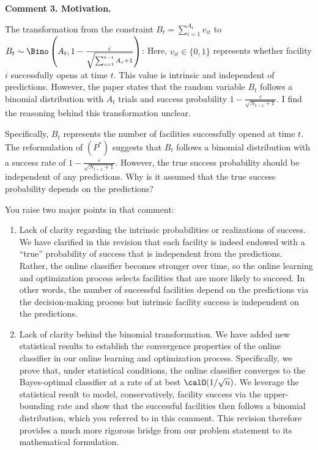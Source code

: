 \documentclass[11pt]{article}
\begin{document}
\begin{commentBox}
    \textbf{Comment 3. Motivation.}\label{R2:3}

    The transformation from the constraint $B_t=\sum_{i=1}^{A_t} v_{it}$ to $B_t\sim \Bino\left(A_t, 1-\frac{\varepsilon}{\sqrt{\sum_{s=1}^{t-1} A_s +1}}\right)$: Here, $v_{it}\in \{0,1\}$ represents whether facility $i$ successfully opens at time $t$. This value is intrinsic and independent of predictions. However, the paper states that the random variable $B_t$ follows a binomial distribution with $A_t$ trials and success probability $1-\frac{\varepsilon}{\sqrt{N_{t-1}+1}}$. I find the reasoning behind this transformation unclear.

    Specifically, $B_t$ represents the number of facilities successfully opened at time $t$. The reformulation of $(P^*)$ suggests that $B_t$ follows a binomial distribution with a success rate of $1-\frac{\varepsilon}{\sqrt{N_{t-1}+1}}$. However, the true success probability should be independent of any predictions. Why is it assumed that the true success probability depends on the predictions?
\end{commentBox}

You raise two major points in that comment:
\begin{enumerate}
    \item Lack of clarity regarding the intrinsic probabilities or realizations of success. We have clarified in this revision that each facility is indeed endowed with a ``true'' probability of success that is independent from the predictions. Rather, the online classifier becomes stronger over time, so the online learning and optimization process selects facilities that are more likely to succeed. In other words, the number of successful facilities depend on the predictions via the decision-making process but intrinsic facility success is independent on the predictions.
    \item Lack of clarity behind the binomial transformation. We have added new statistical results to establish the convergence properties of the online classifier in our online learning and optimization process. Specifically, we prove that, under statistical conditions, the online classifier converges to the Bayes-optimal classifier at a rate of at best $\calO(1/\sqrt{n})$. We leverage the statistical result to model, conservatively, facility success via the upper-bounding rate and show that the successful facilities then follows a binomial distribution, which you referred to in this comment. This revision therefore provides a much more rigorous bridge from our problem statement to its mathematical formulation.
\end{enumerate}
\end{document}
